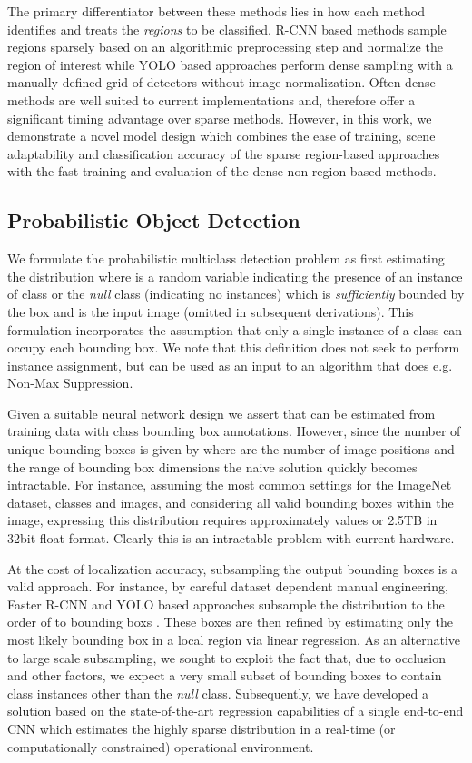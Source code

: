 \documentclass[10pt,twocolumn]{article}
\begin{document}
The primary differentiator between these methods lies in how each method identifies and treats the \textit{regions} to be classified. R-CNN based methods sample regions sparsely based on an algorithmic preprocessing step and normalize the region of interest while YOLO based approaches perform dense sampling with a manually defined grid of detectors without image normalization. Often dense methods are well suited to current implementations and, therefore offer a significant timing advantage over sparse methods. However, in this work, we demonstrate a novel model design which combines the ease of training, scene adaptability and classification accuracy of the sparse region-based approaches with the fast training and evaluation of the dense non-region based methods. 


\subsection{Probabilistic Object Detection}

We formulate the probabilistic multiclass detection problem as first estimating the distribution  where  is a 
random variable indicating the presence of an instance of class  or the \textit{null} class (indicating no instances) which is \textit{sufficiently} bounded by the box  and  is the input image (omitted in subsequent derivations).
This formulation incorporates the assumption that only a single instance of a class can occupy each bounding box.
We note that this definition does not seek to perform instance assignment, but can be used as an input to an algorithm that does e.g. Non-Max Suppression.

Given a suitable neural network design we assert that  can be estimated from training data with class bounding box annotations. However, since the number of unique bounding boxes is given by  where  are the number of image positions and  the range of bounding box dimensions the naive solution quickly becomes intractable. For instance, assuming the most common settings for the ImageNet dataset,  classes and  images, and considering all valid bounding boxes within the image, expressing this distribution requires approximately  values or 2.5TB in 32bit float format. Clearly this is an intractable problem with current hardware. 


At the cost of localization accuracy, subsampling the output bounding boxes is a valid approach. 
For instance, by careful dataset dependent manual engineering, Faster R-CNN and YOLO based approaches subsample the distribution to the order of  to  bounding boxs \cite{yolo} \cite{faster-rcnn}. These boxes are then refined by estimating only the most likely bounding box in a local region via linear regression. As an alternative to large scale subsampling, we sought to exploit the fact that, due to occlusion and other factors, we expect a very small subset of bounding boxes to contain class instances other than the \textit{null} class. Subsequently, we have developed a solution based on the state-of-the-art regression capabilities of a single end-to-end CNN which estimates the highly sparse distribution  in a real-time (or computationally constrained) operational environment.
\end{document}
